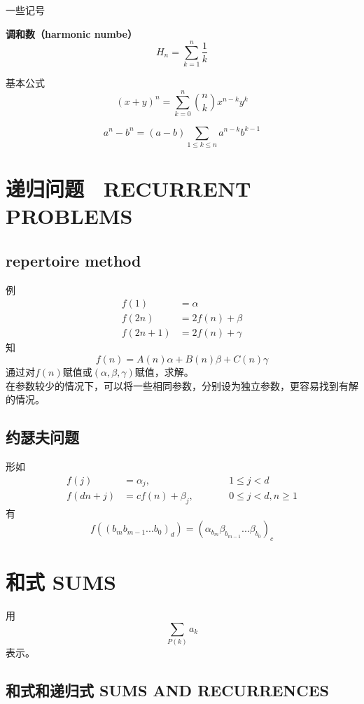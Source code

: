 \documentclass[12pt, a4paper, oneside]{ctexbook}
\begin{document}
一些记号

\textbf{调和数（harmonic numbe）}
$$
H_n=\sum_{k=1}^{n} \frac{1}{k}
$$

基本公式
$$
(x+y)^n=\sum_{k=0}^{n}\binom{n}{k}x^{n-k}y^{k}
$$

$$
a^n-b^n=(a-b)\sum_{1 \le k\le n} a^{n-k}b^{k-1}
$$

\section{递归问题　RECURRENT PROBLEMS}

\subsection{repertoire method}
例
$$
\begin{aligned}
f(1)&=\alpha\\
f(2n)&=2f(n)+\beta\\
f(2n+1)&=2f(n)+\gamma
\end{aligned}
$$
知
$$
f(n)=A(n)\alpha+B(n)\beta+C(n)\gamma
$$
通过对$f(n)$赋值或$(\alpha,\beta,\gamma)$赋值，求解。\\

在参数较少的情况下，可以将一些相同参数，分别设为独立参数，更容易找到有解的情况。
\subsection{约瑟夫问题}
形如
$$
\begin{aligned}
f(j)&=\alpha_j,\qquad &&1\le j<d\\
f(dn+j)&=cf(n)+\beta_j,\qquad  &&0\le j<d,n\ge 1
\end{aligned}
$$
有
$$
f((b_mb_{m-1}...b_0)_d)=(\alpha_{b_m}\beta_{b_{m-1}}...\beta_{b_0})_c
$$




\section{和式 SUMS} 

用
$$
\sum_{P(k)} a_k
$$
表示。

\subsection{和式和递归式 SUMS AND RECURRENCES}
\end{document}
